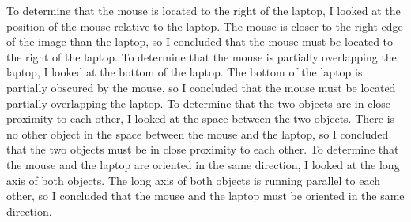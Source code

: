 \begin{enumerate}
{        To determine that the mouse is located to the right of the laptop, I looked at the position of the mouse relative to the laptop. The mouse is closer to the right edge of the image than the laptop, so I concluded that the mouse must be located to the right of the laptop.
        To determine that the mouse is partially overlapping the laptop, I looked at the bottom of the laptop. The bottom of the laptop is partially obscured by the mouse, so I concluded that the mouse must be located partially overlapping the laptop.
        To determine that the two objects are in close proximity to each other, I looked at the space between the two objects. There is no other object in the space between the mouse and the laptop, so I concluded that the two objects must be in close proximity to each other.
        To determine that the mouse and the laptop are oriented in the same direction, I looked at the long axis of both objects. The long axis of both objects is running parallel to each other, so I concluded that the mouse and the laptop must be oriented in the same direction.}
    \end{enumerate}
